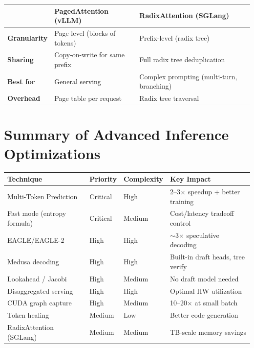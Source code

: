 \documentclass[11pt,a4paper]{article}
\begin{document}
\begin{center}
\begin{tabular}{lL{5cm}L{5cm}}
\toprule
& \textbf{PagedAttention (vLLM)} & \textbf{RadixAttention (SGLang)} \\
\midrule
\textbf{Granularity} & Page-level (blocks of tokens) & Prefix-level (radix tree) \\
\textbf{Sharing} & Copy-on-write for same prefix & Full radix tree deduplication \\
\textbf{Best for} & General serving & Complex prompting (multi-turn, branching) \\
\textbf{Overhead} & Page table per request & Radix tree traversal \\
\bottomrule
\end{tabular}
\end{center}

\section{Summary of Advanced Inference Optimizations}

\begin{center}
\begin{tabular}{L{4cm}llL{4cm}}
\toprule
\textbf{Technique} & \textbf{Priority} & \textbf{Complexity} & \textbf{Key Impact} \\
\midrule
Multi-Token Prediction & Critical & High & 2--3$\times$ speedup + better training \\
Fast mode (entropy formula) & Critical & Medium & Cost/latency tradeoff control \\
EAGLE/EAGLE-2 & High & High & $\sim$3$\times$ speculative decoding \\
Medusa decoding & High & High & Built-in draft heads, tree verify \\
Lookahead / Jacobi & High & Medium & No draft model needed \\
Disaggregated serving & High & High & Optimal HW utilization \\
CUDA graph capture & High & Medium & 10--20$\times$ at small batch \\
Token healing & Medium & Low & Better code generation \\
RadixAttention (SGLang) & Medium & Medium & TB-scale memory savings \\
\bottomrule
\end{tabular}
\end{center}
\end{document}
